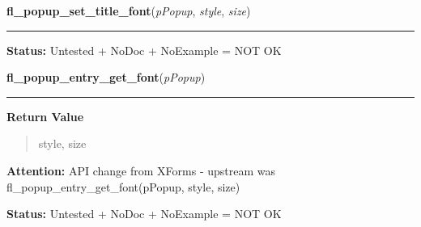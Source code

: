     \label{xformslib:library:fl_popup_set_title_font}

    \vspace{0.5ex}

\hspace{.8\funcindent}\begin{boxedminipage}{\funcwidth}

    \raggedright \textbf{fl\_popup\_set\_title\_font}(\textit{pPopup}, \textit{style}, \textit{size})

    \vspace{-1.5ex}

    \rule{\textwidth}{0.5\fboxrule}
\setlength{\parskip}{2ex}
\setlength{\parskip}{1ex}
\textbf{Status:} Untested + NoDoc + NoExample = NOT OK



    \end{boxedminipage}

    \label{xformslib:library:fl_popup_entry_get_font}

    \vspace{0.5ex}

\hspace{.8\funcindent}\begin{boxedminipage}{\funcwidth}

    \raggedright \textbf{fl\_popup\_entry\_get\_font}(\textit{pPopup})

    \vspace{-1.5ex}

    \rule{\textwidth}{0.5\fboxrule}
\setlength{\parskip}{2ex}
\setlength{\parskip}{1ex}
      \textbf{Return Value}
    \vspace{-1ex}

      \begin{quote}
      style, size

      \end{quote}

\textbf{Attention:} API change from XForms - upstream was fl\_popup\_entry\_get\_font(pPopup, 
style, size)



\textbf{Status:} Untested + NoDoc + NoExample = NOT OK



    \end{boxedminipage}

